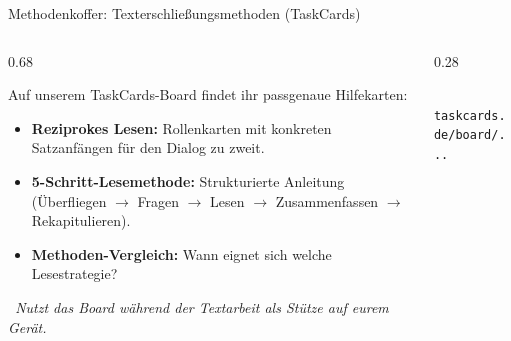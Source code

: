 \documentclass[aspectratio=169, 10pt]{beamer}
\begin{document}
\begin{frame}{Methodenkoffer: Texterschließungsmethoden (TaskCards)}
    \vspace{-0.2cm}
    \begin{columns}[T]
        \begin{column}{0.68\textwidth}
            \begin{tcolorbox}[infoCard, title={\faThLarge\ Digitales Methoden-Board (Philosophie Q1 · Herr Dayi)}]
                \footnotesize
                Auf unserem TaskCards-Board findet ihr passgenaue Hilfekarten:
                \begin{itemize}\setlength{\itemsep}{3pt}
                    \item \textbf{Reziprokes Lesen:} Rollenkarten mit konkreten Satzanfängen für den Dialog zu zweit.
                    \item \textbf{5-Schritt-Lesemethode:} Strukturierte Anleitung (Überfliegen $\rightarrow$ Fragen $\rightarrow$ Lesen $\rightarrow$ Zusammenfassen $\rightarrow$ Rekapitulieren).
                    \item \textbf{Methoden-Vergleich:} Wann eignet sich welche Lesestrategie?
                \end{itemize}
                \vspace{0.1cm}
                \textit{\faInfoCircle\ Nutzt das Board während der Textarbeit als Stütze auf eurem Gerät.}
            \end{tcolorbox}
        \end{column}

        \begin{column}{0.28\textwidth}
            \centering
            \begin{tcolorbox}[enhanced, colframe=primaryBlue, colback=white, arc=3mm, boxrule=0.8pt, title={\faQrcode\ TaskCards Board}]
                \centering
                \\[0.15cm]
                \tiny\texttt{taskcards.de/board/...}
            \end{tcolorbox}
        \end{column}
    \end{columns}
\end{frame}
\end{document}
